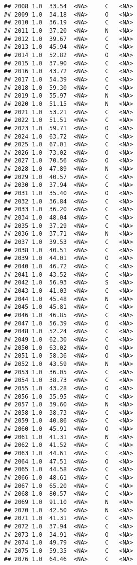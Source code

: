 \documentclass[
]{article}
\begin{document}
\begin{verbatim}
## 2008 1.0  33.54  <NA>     C   <NA>
## 2009 1.0  34.18  <NA>     O   <NA>
## 2010 1.0  36.19  <NA>     C   <NA>
## 2011 1.0  37.20  <NA>     N   <NA>
## 2012 1.0  39.67  <NA>     C   <NA>
## 2013 1.0  45.94  <NA>     C   <NA>
## 2014 1.0  52.82  <NA>     O   <NA>
## 2015 1.0  37.90  <NA>     C   <NA>
## 2016 1.0  43.72  <NA>     C   <NA>
## 2017 1.0  54.39  <NA>     C   <NA>
## 2018 1.0  59.30  <NA>     C   <NA>
## 2019 1.0  55.97  <NA>     N   <NA>
## 2020 1.0  51.15  <NA>     N   <NA>
## 2021 1.0  53.21  <NA>     C   <NA>
## 2022 1.0  51.51  <NA>     C   <NA>
## 2023 1.0  59.71  <NA>     O   <NA>
## 2024 1.0  63.72  <NA>     C   <NA>
## 2025 1.0  67.01  <NA>     C   <NA>
## 2026 1.0  73.02  <NA>     O   <NA>
## 2027 1.0  70.56  <NA>     O   <NA>
## 2028 1.0  47.89  <NA>     N   <NA>
## 2029 1.0  40.57  <NA>     C   <NA>
## 2030 1.0  37.94  <NA>     C   <NA>
## 2031 1.0  35.40  <NA>     O   <NA>
## 2032 1.0  36.84  <NA>     C   <NA>
## 2033 1.0  36.20  <NA>     C   <NA>
## 2034 1.0  48.04  <NA>     C   <NA>
## 2035 1.0  37.29  <NA>     C   <NA>
## 2036 1.0  37.71  <NA>     N   <NA>
## 2037 1.0  39.53  <NA>     C   <NA>
## 2038 1.0  40.51  <NA>     C   <NA>
## 2039 1.0  44.01  <NA>     O   <NA>
## 2040 1.0  46.72  <NA>     C   <NA>
## 2041 1.0  43.52  <NA>     C   <NA>
## 2042 1.0  56.93  <NA>     S   <NA>
## 2043 1.0  41.03  <NA>     C   <NA>
## 2044 1.0  45.48  <NA>     N   <NA>
## 2045 1.0  45.81  <NA>     C   <NA>
## 2046 1.0  46.85  <NA>     C   <NA>
## 2047 1.0  56.39  <NA>     O   <NA>
## 2048 1.0  52.24  <NA>     C   <NA>
## 2049 1.0  62.30  <NA>     C   <NA>
## 2050 1.0  63.02  <NA>     O   <NA>
## 2051 1.0  58.36  <NA>     O   <NA>
## 2052 1.0  43.59  <NA>     N   <NA>
## 2053 1.0  36.05  <NA>     C   <NA>
## 2054 1.0  38.73  <NA>     C   <NA>
## 2055 1.0  43.28  <NA>     O   <NA>
## 2056 1.0  35.95  <NA>     C   <NA>
## 2057 1.0  39.60  <NA>     N   <NA>
## 2058 1.0  38.73  <NA>     C   <NA>
## 2059 1.0  40.86  <NA>     C   <NA>
## 2060 1.0  45.91  <NA>     O   <NA>
## 2061 1.0  41.31  <NA>     N   <NA>
## 2062 1.0  41.52  <NA>     C   <NA>
## 2063 1.0  44.61  <NA>     C   <NA>
## 2064 1.0  47.51  <NA>     O   <NA>
## 2065 1.0  44.58  <NA>     C   <NA>
## 2066 1.0  48.61  <NA>     C   <NA>
## 2067 1.0  65.20  <NA>     C   <NA>
## 2068 1.0  80.57  <NA>     C   <NA>
## 2069 1.0  91.10  <NA>     N   <NA>
## 2070 1.0  42.50  <NA>     N   <NA>
## 2071 1.0  41.31  <NA>     C   <NA>
## 2072 1.0  37.94  <NA>     C   <NA>
## 2073 1.0  34.91  <NA>     O   <NA>
## 2074 1.0  49.79  <NA>     C   <NA>
## 2075 1.0  59.35  <NA>     C   <NA>
## 2076 1.0  64.46  <NA>     C   <NA>

\end{verbatim}
\end{document}
